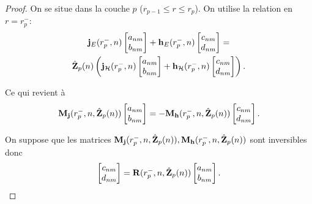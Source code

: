     \begin{proof}
      On se situe dans la couche \(p\) (\(r_{p-1}\le r\le r_p\)). On utilise la relation en \(r=r_p^-\):
      \begin{multline*}
        \mathbf{j}_{E}(r_{p}^-,n)
        \begin{bmatrix}
          a_{nm} \\
          b_{nm}
        \end{bmatrix}
        +
        \mathbf{h}_{E}(r_{p}^-,n)
        \begin{bmatrix}
          c_{nm} \\
          d_{nm}
        \end{bmatrix}
        =
        \\
        \hat {\mathbf{Z}}_{p}(n)
        \left(
          \mathbf{j}_{\mathcal{H}}(r_{p}^-,n)
          \begin{bmatrix}
            a_{nm} \\
            b_{nm}
          \end{bmatrix}
          +
          \mathbf{h}_{\mathcal{H}}(r_{p}^-,n)
          \begin{bmatrix}
            c_{nm} \\
            d_{nm}
          \end{bmatrix}
        \right).
      \end{multline*}

      Ce qui revient à 
      \begin{equation*}
        \mathbf{M}_{\mathbf{j}}(r_{p}^-,n,\hat{\mathbf{Z}}_p(n))
        \begin{bmatrix}
          a_{nm} \\
          b_{nm}
        \end{bmatrix}
        =
        -\mathbf{M}_{\mathbf{h}}(r_{p}^-,n,\hat{\mathbf{Z}}_p(n))
        \begin{bmatrix}
          c_{nm} \\
          d_{nm}
        \end{bmatrix}.
      \end{equation*}

      On suppose que les matrices \(\mathbf{M}_{\mathbf{j}}(r_p^-,n,\hat{\mathbf{Z}}_p(n)), \mathbf{M}_{\mathbf{h}}(r_p^-,n,\hat{\mathbf{Z}}_p(n))\) sont inversibles donc
      \begin{equation*}
        \begin{bmatrix}
          c_{nm} \\
          d_{nm}
        \end{bmatrix}
        =
        \mathbf{R}(r_{p}^-,n,\hat{\mathbf{Z}}_p(n))
        \begin{bmatrix}
          a_{nm} \\
          b_{nm}
        \end{bmatrix}.
      \end{equation*}


\end{proof}
